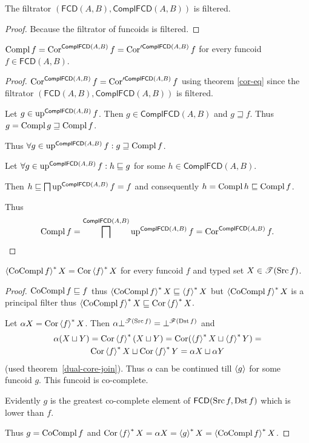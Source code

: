 \begin{prop}
The filtrator $(\mathsf{FCD}(A,B),\mathsf{ComplFCD}(A,B))$ is
filtered.\end{prop}
\begin{proof}
Because the filtrator of funcoids is filtered.\end{proof}
\begin{thm}
$\operatorname{Compl} f=\operatorname{Cor}^{\mathsf{ComplFCD}(A,B)}f=\operatorname{Cor}'^{\mathsf{ComplFCD}(A,B)}f$
for every funcoid $f\in\mathsf{FCD}(A,B)$.\end{thm}
\begin{proof}
$\operatorname{Cor}^{\mathsf{ComplFCD}(A,B)}f=\operatorname{Cor}'^{\mathsf{ComplFCD}(A,B)}f$
using theorem \ref{cor-eq} since the filtrator
$(\mathsf{FCD}(A,B),\mathsf{ComplFCD}(A,B))$
is filtered.

Let $g\in\operatorname{up}^{\mathsf{ComplFCD}(A,B)}f$. Then
$g\in\mathsf{ComplFCD}(A,B)$ and $g\sqsupseteq f$. Thus $g=\operatorname{Compl}
g\sqsupseteq\operatorname{Compl} f$.

Thus $\forall g\in\operatorname{up}^{\mathsf{ComplFCD}(A,B)}f:g\sqsupseteq\operatorname{Compl} f$.

Let $\forall g\in\operatorname{up}^{\mathsf{ComplFCD}(A,B)}f:h\sqsubseteq g$
for some $h\in\mathsf{ComplFCD}(A,B)$.

Then $h\sqsubseteq\bigsqcap\operatorname{up}^{\mathsf{ComplFCD}(A,B)}f=f$
and consequently $h=\operatorname{Compl} h\sqsubseteq\operatorname{Compl} f$.

Thus
\[
\operatorname{Compl}
f=\bigsqcap^{\mathsf{ComplFCD}(A,B)}\operatorname{up}^{\mathsf{ComplFCD}(A,B)}f=\operatorname{Cor}^{\mathsf{
ComplFCD}(A,B)}f.
\]
\end{proof}
\begin{thm}
$\left\langle \operatorname{CoCompl} f\right\rangle ^{\ast}X=\operatorname{Cor}\left\langle f\right\rangle ^{\ast}X$ for every funcoid $f$ and
typed set $X\in\mathscr{T}(\operatorname{Src} f)$.\end{thm}
\begin{proof}
$\operatorname{CoCompl} f\sqsubseteq f$ thus $\left\langle \operatorname{CoCompl} f\right\rangle ^{\ast}X\sqsubseteq\left\langle f\right\rangle ^{\ast}X$
but $\left\langle \operatorname{CoCompl} f\right\rangle ^{\ast}X$ is a principal filter thus $\left\langle \operatorname{CoCompl}
f\right\rangle ^{\ast}X\sqsubseteq\operatorname{Cor}\left\langle f\right\rangle ^{\ast}X$.

Let $\alpha X=\operatorname{Cor}\left\langle f\right\rangle ^{\ast}X$. Then $\alpha\bot^{\mathscr{T}(\operatorname{Src}
f)}=\bot^{\mathscr{F}(\operatorname{Dst} f)}$
and
\begin{multline*}
\alpha(X\sqcup Y)=\operatorname{Cor}\left\langle f\right\rangle ^{\ast}(X\sqcup Y)=\operatorname{Cor}(\left\langle f\right\rangle ^{\ast}X\sqcup\left\langle f\right\rangle ^{\ast}Y)=\\
\operatorname{Cor}\left\langle f\right\rangle ^{\ast}X\sqcup\operatorname{Cor}\left\langle f\right\rangle ^{\ast}Y=\alpha X\sqcup\alpha Y
\end{multline*}
(used theorem~\ref{dual-core-join}). Thus $\alpha$ can be continued
till $\left\langle g\right\rangle$ for some funcoid $g$. This funcoid is co-complete.

Evidently $g$ is the greatest co-complete element of $\mathsf{FCD}(\operatorname{Src} f,\operatorname{Dst}
f)$
which is lower than $f$.

Thus $g=\operatorname{CoCompl} f$ and $\operatorname{Cor}\left\langle f\right\rangle ^{\ast}X=\alpha X=\left\langle g\right\rangle ^{\ast}X=\left\langle \operatorname{CoCompl}
f\right\rangle ^{\ast}X$.\end{proof}
